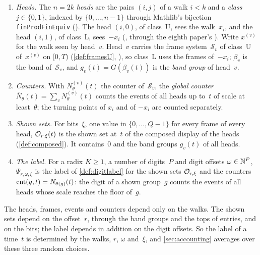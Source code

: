 \begin{definition}\label{def:global}
\begin{enumerate}[label=(\alph*)]
\item \emph{Heads.} The $n=2k$ \emph{heads} are the pairs $(i,j)$ of a walk $i<k$ and a \emph{class} $j\in\{0,1\}$, indexed by
$\{0,\dots,n-1\}$ through Mathlib's bijection \texttt{finProdFinEquiv} (). The head $(i,0)$, of class~U, sees the
walk~$x_i$, and the head $(i,1)$, of class~L, sees~$-x_i$ (, through the eighth paper's
). Write $x^{(v)}$ for the walk seen by head~$v$. Head~$v$ carries the frame system~$\mathcal S_v$ of
class~U of~$x^{(v)}$ on $[0,T)$ (\cref{def:framesU}, ), so class~L uses the frames of~$-x_i$; $\beta_v$ is the
band of~$\mathcal S_v$, and $g_v(t)=G(\beta_v(t))$ is the \emph{band group} of head~$v$.
\item \emph{Counters.} With $N^{(v)}_\theta(t)$ the counter of~$\mathcal S_v$, the \emph{global counter}
$\bar N_\theta(t)=\sum_vN^{(v)}_\theta(t)$ counts the events of all heads up to~$t$ of scale at least~$\theta$; the turning
points of $x_i$ and of $-x_i$ are counted separately.
\item \emph{Shown sets.} For bits~$\xi$, one value in $\{0,\dots,Q-1\}$ for every frame of every head, $\mathcal{O}_{r,\xi}(t)$ is the
shown set at~$t$ of the composed display of the heads (\cref{def:composed}). It contains~$0$ and the band groups $g_v(t)$ of all
heads.
\item \emph{The label.} For a radix $K\ge1$, a number of digits~$P$ and digit offsets $\omega\in\mathbb{N}^P$, $\Psi_{r,\omega,\xi}$ is the
label of \cref{def:digitlabel} for the shown sets $\mathcal{O}_{r,\xi}$ and the counters $\mathrm{cnt}(g,t)=\bar N_{\theta(g)}(t)$: the digit of
a shown group~$g$ counts the events of all heads whose scale reaches the floor of~$g$.
\end{enumerate}
\end{definition}

The heads, frames, events and counters depend only on the walks. The shown sets depend on the offset~$r$, through the band groups
and the tops of entries, and on the bits; the label depends in addition on the digit offsets. So the label of a time~$t$ is
determined by the walks, $r$, $\omega$ and~$\xi$, and \cref{sec:accounting} averages over these three random choices.

